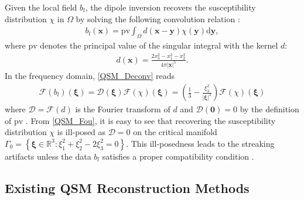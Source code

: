 \documentclass[reqno]{siamonline1116}
\numberwithin{theorem}{section}
\numberwithin{equation}{section}
\def\R{{\mathbb R}}
\def\pv{\mathrm{pv}}
\def\rd{\mathrm{d}}
\def\Om{\Omega}
\def\f{\frac}
\def\x{\boldsymbol{x}}
\def\y{{\boldsymbol y}}
\def\mD{{\mathcal D}}
\def\msF{{\mathscr F}}
\def\0{{\mathbf 0}}
\def\pv{\mathrm{pv}}
\def\xxi{{\boldsymbol{\xi}}}
\begin{document}
Given the local field $b_l$, the dipole inversion recovers the susceptibility distribution $\chi$ in $\Om$ by solving the following convolution relation \cite{T.Liu2011,T.Liu2011a,T.Liu2009}:
\begin{align}\label{QSM_Deconv}
b_l(\x)=\pv\int_{\Om}d(\x-\y)\chi(\y)\rd\y,
\end{align}
where $\pv$ denotes the principal value \cite{E.M.Stein2011} of the singular integral with the kernel $d$:
\begin{align*}
d(\x)=\f{2x_3^2-x_1^2-x_2^2}{4\pi|\x|^5}.
\end{align*}
In the frequency domain, \cref{QSM_Deconv} reads
\begin{align}\label{QSM_Fou}
\msF(b_l)(\xxi)=\mD(\xxi)\msF(\chi)(\xxi)=\left(\f{1}{3}-\f{\xi_3^2}{|\xxi|^2}\right)\msF(\chi)(\xxi)
\end{align}
where $\mD=\msF(d)$ is the Fourier transform of $d$ and $\mD(\0)=0$  by the definition of $\pv$ \cite{L.deRochefort2010,E.M.Haacke2015}. From \eqref{QSM_Fou}, it is easy to see that recovering the susceptibility distribution $\chi$ is ill-posed as $\mD=0$ on the critical manifold $\Gamma_0=\left\{\xxi\in\R^3:\xi_1^2+\xi_2^2-2\xi_3^2=0\right\}$. This ill-posedness leads to the streaking artifacts unless the data $b_l$ satisfies a proper compatibility condition \cite{J.K.Choi2014}.

\subsection{Existing QSM Reconstruction Methods}\label{Existing}
\end{document}
